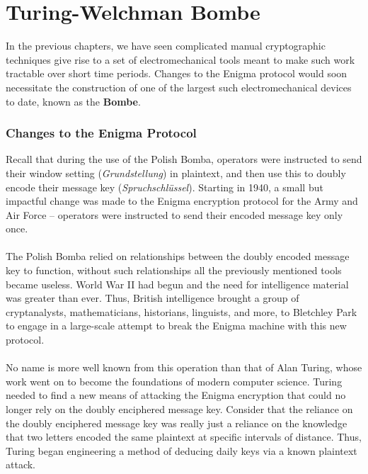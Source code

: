

\chapter{Turing-Welchman Bombe}

In the previous chapters, we have seen complicated manual
cryptographic techniques give rise to a set of electromechanical
tools meant to make such work tractable over short time periods.
Changes to the Enigma protocol would soon necessitate the
construction of one of the largest such electromechanical devices to
date, known as the {\bf{Bombe}}.

\subsection{Changes to the Enigma Protocol}
Recall that during the use of the Polish Bomba, operators were
instructed to send their window setting (\emph{Grundstellung}) in
plaintext, and then use this to doubly encode their message key
(\emph{Spruchschlüssel}). Starting in 1940, a small but impactful
change was made to the Enigma encryption protocol for the Army and
Air Force -- operators were instructed to send their encoded message
key only once.
\\\\The Polish Bomba relied on relationships between the doubly
encoded message key to function, without such relationships all the
previously mentioned tools became useless. World War II had begun and
the need for intelligence material was greater than ever. Thus,
British intelligence brought a group of cryptanalysts,
mathematicians, historians, linguists, and more, to Bletchley Park to
engage in a large-scale attempt to break the Enigma machine with this
new protocol.
\\\\No name is more well known from this operation than that of Alan
Turing, whose work went on to become the foundations of modern
computer science. Turing needed to find a new means of attacking the
Enigma encryption that could no longer rely on the doubly enciphered
message key. Consider that the reliance on the doubly enciphered
message key was really just a reliance on the knowledge that two
letters encoded the same plaintext at specific intervals of distance.
Thus, Turing began engineering a method of deducing daily keys via a
known plaintext attack.

